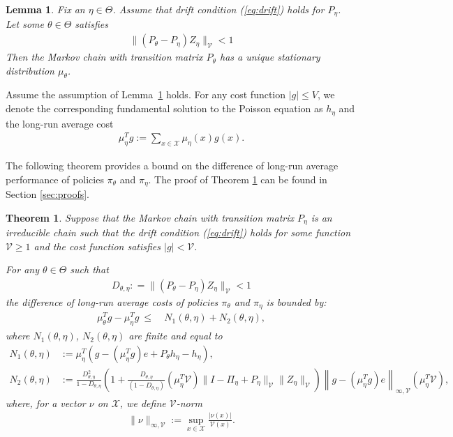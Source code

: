 \documentclass[11pt]{article}
\newcommand{\X}{\mathcal{X}}
\newcommand{\V}{\mathcal{V}}
\newtheorem{lemma}{Lemma}
\newtheorem{theorem}{Theorem}
\theoremstyle{definition}
\numberwithin{equation}{section}
\begin{document}
\begin{lemma}\label{lem:st}
  Fix an $\eta \in \Theta$.
    Assume that drift condition (\ref{eq:drift}) holds for $P_\eta$. Let some $\theta\in \Theta$ satisfies
\begin{align*}
\| (P_{\theta} - P_{\eta}) Z_{\eta}\|_\V^{ } < 1  \end{align*}
Then the Markov chain with transition matrix $P_\theta$ has a unique stationary distribution $\mu_{\theta}$.
\end{lemma}


Assume the assumption of Lemma~\ref{lem:st} holds.
For any cost function $|g|\le V$, we denote
the corresponding fundamental solution to the Poisson equation as
$h_\eta$ and the long-run average cost
\begin{align}\label{eq:ac}
 \mu_\eta^Tg  := \sum\limits_{x\in \X} \mu_\eta(x) g(x).
\end{align}

 The following theorem provides a bound on the difference of long-run average performance of policies $\pi_\theta$ and $\pi_{\eta}$. The proof of Theorem \ref{thm:main} can be found in Section \ref{sec:proofs}.



\begin{theorem}
\label{thm:main}
Suppose that the Markov chain with transition matrix $P_{\eta}$ is  an irreducible  chain such that the drift condition (\ref{eq:drift}) holds for some function $\V\geq1$ and the cost function satisfies $|g|<\V$.

 For any $\theta\in \Theta$ such that
\begin{align}\label{eq:D}
 D_{\theta,\eta} : = \|  (P_{\theta} - P_{\eta}) Z_{\eta}\|_\V^{ } < 1
\end{align}
the difference of long-run average costs of policies $\pi_\theta$ and $\pi_{\eta}$ is bounded by:
   \begin{align}\label{eq:ineq2}
\mu_\theta^Tg- \mu_\eta^Tg ~\leq~ &N_1(\theta, \eta)+  N_2(\theta, \eta),
\end{align}
where $N_1(\theta, \eta)$, $N_2(\theta, \eta)$ are finite and equal to
\begin{align}
N_1(\theta, \eta) &:= \mu_{\eta}^T( g -(\mu_\eta^Tg) e   +P_{\theta}h_{\eta} - h_{\eta} ), \label{eq:M1} \\
N_2(\theta, \eta) &:=\frac{ D_{\theta,\eta}^2}{1- D_{\theta, \eta}}   \left( 1+  \frac{ D_{\theta,\eta}}{(1- D_{\theta,\eta})}  (\mu_{\eta}^T\V) \|I - \Pi_\eta +P_\eta\|_\V^{ } \|Z_{\eta}\|_\V  \right)\left\| g - (\mu_\eta^Tg) e  \right\|^{ }_{\infty, \V}(\mu_{\eta}^T\V), \label{eq:M2}
\end{align}
where,  for a vector $\nu$ on $\X$, we define $\V$-norm
\begin{align}\label{eq:Vnorm}
 \|\nu\|_{\infty, \V} := \sup\limits_{x\in \X} \frac{| \nu(x)|}{\V(x)}.
\end{align}

\end{theorem}
\end{document}
